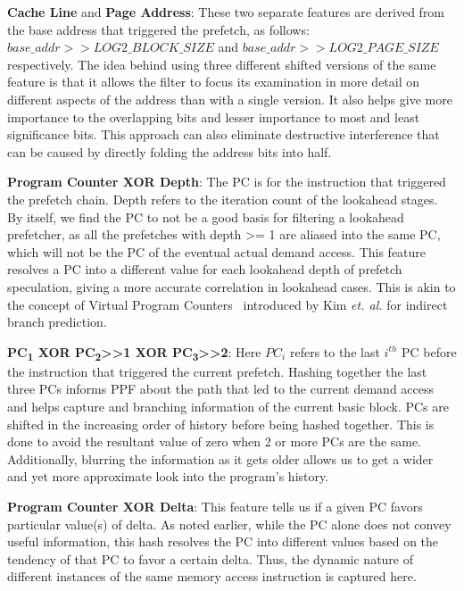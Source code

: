 \noindent \textbf{Cache Line} and \textbf{Page Address}: These two
separate features are derived from the base address that triggered the
prefetch, as follows: $base\_addr >> LOG2\_BLOCK \_SIZE$ and
$base\_addr >> LOG2\_PAGE\_SIZE$ respectively. The idea behind using
three different shifted versions of the same feature is that it allows
the filter to focus its examination in more detail on different
aspects of the address than with a single version.  It also helps give
more importance to the overlapping bits and lesser importance to most
and least significance bits.  This approach can also eliminate
destructive interference that can be caused by directly folding
the address bits into half.

%
\noindent \textbf{Program Counter XOR Depth}: The PC is for the
instruction that triggered the prefetch chain.  Depth refers to the
iteration count of the lookahead stages.  By itself, we find the PC to
not be a good basis for filtering a lookahead prefetcher, as all the
prefetches with depth >= 1 are aliased into the same PC, which will
not be the PC of the eventual actual demand access.  This feature
resolves a PC into a different value for each lookahead depth of
prefetch speculation, giving a more accurate correlation in lookahead
cases.  This is akin to the concept of Virtual Program
Counters~\cite{VPC} introduced by Kim \textit{et. al.} for indirect
branch prediction.

\noindent \textbf{PC\textsubscript{1} XOR PC\textsubscript{2}>>1 XOR
  PC\textsubscript{3}>>2}: Here $PC_i$ refers to the last $i^{th}$ PC
before the instruction that triggered the current prefetch.  Hashing
together the last three PCs informs PPF about the path that led to the
current demand access and helps capture and branching information of
the current basic block.  PCs are shifted in the increasing order of
history before being hashed together. This is done to avoid the
resultant value of zero when 2 or more PCs are the same. Additionally,
blurring the information as it gets older allows us to get a wider and
yet more approximate look into the program's history.

\noindent \textbf{Program Counter XOR Delta}: This feature tells us if
a given PC favors particular value(s) of delta.  As noted earlier,
while the PC alone does not convey useful information, this hash
resolves the PC into different values based on the tendency of that PC
to favor a certain delta.  Thus, the dynamic nature of different
instances of the same memory access instruction is captured here.

